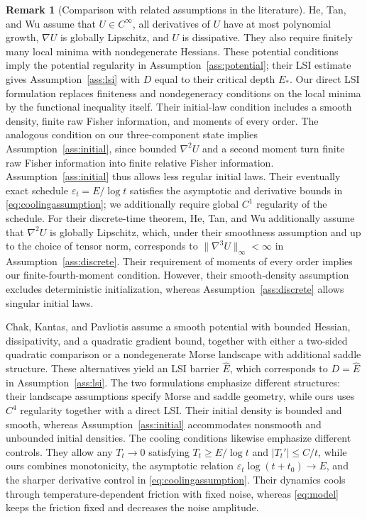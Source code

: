 \documentclass[11pt]{article}
\theoremstyle{definition}
\newtheorem{remark}[theorem]{Remark}
\newcommand{\eps}{\varepsilon}
\begin{document}
\begin{remark}[Comparison with related assumptions in the literature]\label{rem:assumptioncomparison}
He, Tan, and Wu \cite[Assumptions~2.1 and 2.3]{HeTanWu2024} assume that
$U\in C^\infty$, all derivatives of $U$ have at most polynomial growth,
$\nabla U$ is globally Lipschitz, and $U$ is dissipative. They also require
finitely many local minima with nondegenerate Hessians. These potential
conditions imply the potential regularity in Assumption~\ref{ass:potential};
their LSI estimate \cite[Proposition~3.1]{HeTanWu2024} gives
Assumption~\ref{ass:lsi} with $D$ equal to their critical depth $E_*$. Our
direct LSI formulation replaces finiteness and nondegeneracy conditions on the
local minima by the functional inequality itself. Their initial-law condition
includes a smooth density, finite raw Fisher information, and moments of every
order. The analogous condition on our three-component state implies
Assumption~\ref{ass:initial}, since bounded $\nabla^2U$ and a second moment
turn finite raw Fisher information into finite relative Fisher information.
Assumption~\ref{ass:initial} thus allows less regular initial laws. Their
eventually exact schedule $\eps_t=E/\log t$ satisfies the asymptotic and
derivative bounds in \eqref{eq:coolingassumption}; we additionally require
global $C^1$ regularity of the schedule. For their discrete-time theorem,
He, Tan, and Wu \cite[Theorem~2.7]{HeTanWu2024} additionally assume that
$\nabla^2U$ is globally Lipschitz, which, under their smoothness assumption and
up to the choice of tensor norm, corresponds to
$\|\nabla^3U\|_\infty<\infty$ in Assumption~\ref{ass:discrete}. Their
requirement of moments of every order implies our finite-fourth-moment
condition. However, their smooth-density assumption excludes deterministic
initialization, whereas Assumption~\ref{ass:discrete} allows singular initial
laws.

Chak, Kantas, and Pavliotis
\cite[Assumptions~1--4]{ChakKantasPavliotis2023} assume a smooth potential with
bounded Hessian, dissipativity, and a quadratic gradient bound, together with
either a two-sided quadratic comparison or a nondegenerate Morse landscape with
additional saddle structure. These alternatives yield an LSI barrier
$\widehat{E}$, which corresponds to $D=\widehat{E}$ in
Assumption~\ref{ass:lsi}. The two formulations emphasize different structures:
their landscape assumptions specify Morse and saddle geometry, while ours uses
$C^4$ regularity together with a direct LSI. Their initial density is bounded and
smooth, whereas Assumption~\ref{ass:initial} accommodates nonsmooth and unbounded
initial densities. The cooling conditions likewise emphasize different controls.
They allow any $T_t\to0$ satisfying $T_t\geq E/\log t$ and
$|T_t'|\leq C/t$, while ours combines monotonicity, the asymptotic relation
$\eps_t\log(t+t_0)\to E$, and the sharper derivative control in
\eqref{eq:coolingassumption}. Their dynamics cools through
temperature-dependent friction with fixed noise, whereas \eqref{eq:model} keeps
the friction fixed and decreases the noise amplitude.
\end{remark}
\end{document}
